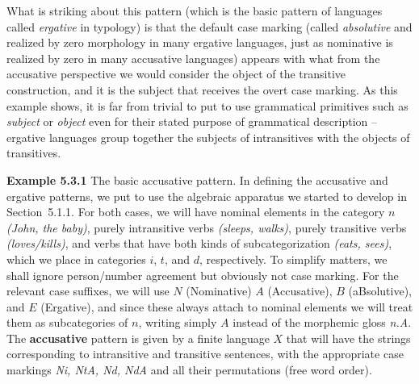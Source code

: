 \noindent 
What is striking about this pattern (which is the basic pattern of languages
called {\it ergative} in typology) is that the default case marking (called
{\it absolutive} and realized by zero morphology in many ergative languages,
just as nominative is realized by zero in many accusative languages) appears
with what from the accusative perspective we would consider the object of the
transitive construction, and it is the subject that receives the overt case
marking.  As this example shows, it is far from trivial to put to use
grammatical primitives such as {\it subject} or {\it object} even for their
stated purpose of grammatical description -- ergative languages group together
the subjects of intransitives with the objects of transitives.

\smallskip
\noindent
{\bf Example 5.3.1} The basic accusative pattern. In defining the accusative
and ergative patterns, we put to use the algebraic apparatus we started to
develop in Section~5.1.1.  For both cases, we will have nominal elements in
the category $n$ {\it (John, the baby)}, purely intransitive verbs {\it
  (sleeps, walks)}, purely transitive verbs {\it (loves/kills)}, and verbs
that have both kinds of subcategorization {\it (eats, sees)}, which we place
in categories $i$, $t$, and $d$, respectively. To simplify matters, we shall
ignore person/number agreement but obviously not case marking. For the
relevant case suffixes, we will use $N$ (Nominative) $A$ (Accusative), $B$
(aBsolutive), and $E$ (Ergative), and since these always attach to nominal
elements we will treat them as subcategories of $n$, writing simply $A$
instead of the morphemic gloss {\it n.A}. The {\bf accusative} pattern is
given by a finite language $X$ that will have the strings corresponding to
intransitive and transitive sentences, with the appropriate case markings {\it
  Ni, NtA, Nd, NdA} and all their permutations (free word order).

